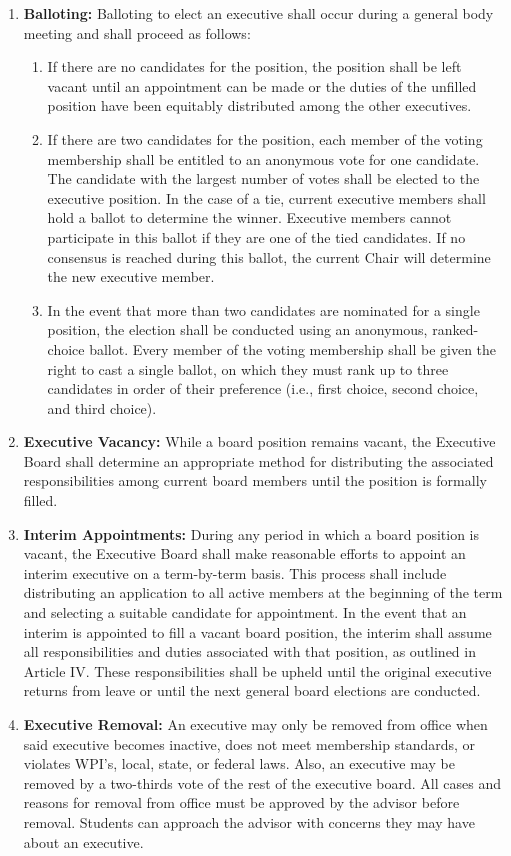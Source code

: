\documentclass[11pt]{article}
\begin{document}
\begin{enumerate}
    \item \textbf{Balloting:} Balloting to elect an executive shall occur during a general body meeting and shall proceed as follows:
    \begin{enumerate}
        \item If there are no candidates for the position, the position shall be left vacant until an appointment can be made or the duties of the unfilled position have been equitably distributed among the other executives.
        \item If there are two candidates for the position, each member of the voting membership shall be entitled to an anonymous vote for one candidate. The candidate with the largest number of votes shall be elected to the executive position. In the case of a tie, current executive members shall hold a ballot to determine the winner. Executive members cannot participate in this ballot if they are one of the tied candidates. If no consensus is reached during this ballot, the current Chair will determine the new executive member.
        \item In the event that more than two candidates are nominated for a single position, the election shall be conducted using an anonymous, ranked-choice ballot. Every member of the voting membership shall be given the right to cast a single ballot, on which they must rank up to three candidates in order of their preference (i.e., first choice, second choice, and third choice).
    \end{enumerate}

    \item \textbf{Executive Vacancy:} While a board position remains vacant, the Executive Board shall determine an appropriate method for distributing the associated responsibilities among current board members until the position is formally filled.

    \item \textbf{Interim Appointments:} During any period in which a board position is vacant, the Executive Board shall make reasonable efforts to appoint an interim executive on a term-by-term basis. This process shall include distributing an application to all active members at the beginning of the term and selecting a suitable candidate for appointment. In the event that an interim is appointed to fill a vacant board position, the interim shall assume all responsibilities and duties associated with that position, as outlined in Article IV. These responsibilities shall be upheld until the original executive returns from leave or until the next general board elections are conducted.

    \item \textbf{Executive Removal:} An executive may only be removed from office when said executive becomes inactive, does not meet membership standards, or violates WPI's, local, state, or federal laws. Also, an executive may be removed by a two-thirds vote of the rest of the executive board. All cases and reasons for removal from office must be approved by the advisor before removal. Students can approach the advisor with concerns they may have about an executive.
\end{enumerate}
\end{document}
